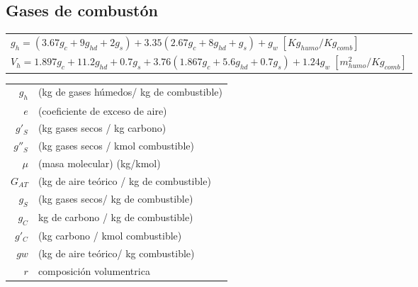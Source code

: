 \documentclass[11pt,a4paper]{article}
\begin{document}
\begin{cajita}
		\section*{Gases de combustón}
		\renewcommand{\arraystretch}{1.5}
		\begin{tabular}{l}
			$g_{h} = (3.67 g_{c} + 9 g_{hd} +2 g_{s}) + 3.35 (2.67 g_{c} + 8 g_{hd} + g_{s}) + g_{w} \; [Kg_{humo}/Kg_{comb}]$\\
			$V_{h} = 1.897 g_{c} + 11.2 g_{hd} +0.7 g_{s} + 3.76 (1.867 g_{c} + 5.6 g_{hd} +0.7 g_{s}) + 1.24 g_{w} \; [m^{2}_{humo}/Kg_{comb}]$\\
		\end{tabular}
		
	\end{cajita}
	
	\begin{cajita}
		\begin{multicols}{2}
			\begin{tabular}{r p{}}
				$g_{h}$ & (kg de gases húmedos/ kg de combustible)\\
				$e$ & (coeficiente de exceso de aire)\\
				$g'_{S}$ & (kg gases secos / kg carbono)\\
				$g''_{S}$ & (kg gases secos / kmol combustible)\\
				$\mu$ & (masa molecular) (kg/kmol)\\
				$G_{AT}$ & (kg de aire teórico / kg de combustible)\\
				$g_{S}$ & (kg gases secos/ kg de combustible)\\
				$g_{C}$ & kg de carbono / kg de combustible)\\
				$g'_{C}$ & (kg carbono / kmol combustible)\\
				$g{w}$ & (kg de aire teórico/ kg combustible)\\
				$r$ & composición volumentrica\\
				

\end{tabular}
\end{multicols}
\end{cajita}
\end{document}
